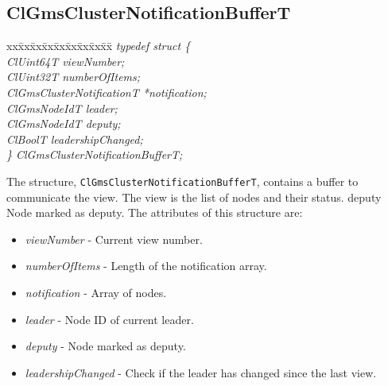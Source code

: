 \begin{flushleft}
\subsection{ClGmsClusterNotificationBufferT}
\begin{tabbing}
xx\=xx\=xx\=xx\=xx\=xx\=xx\=xx\=xx\=\kill
\textit{typedef struct \{}\\
\>\>\>\>\textit{ClUint64T                   viewNumber;}\\
\>\>\>\>\textit{ClUint32T                   numberOfItems;}\\
\>\>\>\>\textit{ClGmsClusterNotificationT  *notification;}\\
\>\>\>\>\textit{ClGmsNodeIdT                leader;}\\
\>\>\>\>\textit{ClGmsNodeIdT                deputy;}\\
\>\>\>\>\textit{ClBoolT                     leadershipChanged;}\\
\textit{\} ClGmsClusterNotificationBufferT;}\end{tabbing} 
The
structure, {\tt{ClGmsClusterNotificationBufferT}}, contains a buffer
to communicate the view. The view is the list of nodes and their
status. deputy Node marked as deputy. The attributes of this structure are:
\begin{itemize}
\item \textit{viewNumber} - Current view number.
\item \textit{numberOfItems} - Length of the notification array.
\item \textit{notification} - Array of nodes.
\item \textit{leader} - Node ID of current leader.
\item \textit{deputy} - Node marked as deputy.
\item \textit{leadershipChanged} - Check if the leader has changed since the last view.
\end{itemize}



\end{flushleft}
